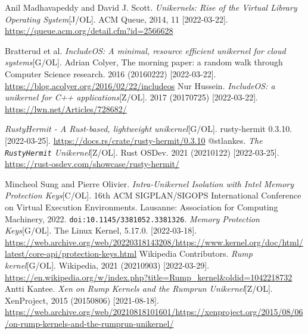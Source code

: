 \documentclass[UTF8,fontset=none,linespread=1.15]{ctexart}
\begin{document}
\begin{thebibliography}{99}
 Anil Madhavapeddy and David J. Scott. \textit{Unikernels: Rise of the Virtual Library Operating System}[J/OL]. ACM Queue, 2014, 11 [2022-03-22].  \url{https://queue.acm.org/detail.cfm?id=2566628}

  Bratterud et al. \textit{IncludeOS: A minimal, resource efficient unikernel for cloud systems}[G/OL]. Adrian Colyer, The morning paper: a random walk through Computer Science research. 2016 (20160222) [2022-03-22]. \url{https://blog.acolyer.org/2016/02/22/includeos}
 Nur Hussein. \textit{IncludeOS: a unikernel for C++ applications}[Z/OL]. 2017 (20170725) [2022-03-22]. \url{https://lwn.net/Articles/728682/}

 \textit{RustyHermit - A Rust-based, lightweight unikernel}[G/OL]. rusty-hermit 0.3.10. [2022-03-25]. \url{https://docs.rs/crate/rusty-hermit/0.3.10}
 @stlankes. \textit{The \texttt{RustyHermit} Unikernel}[Z/OL]. Rust OSDev. 2021 (20210122) [2022-03-25]. \url{https://rust-osdev.com/showcase/rusty-hermit/}

 Mincheol Sung and Pierre Olivier. \textit{Intra-Unikernel Isolation with Intel Memory Protection Keys}[C/OL]. 16th ACM SIGPLAN/SIGOPS International Conference on Virtual Execution Environments. Lausanne: Association for Computing Machinery, 2022. \texttt{doi:10.1145/3381052.3381326}.
 \textit{Memory Protection Keys}[G/OL]. The Linux Kernel, 5.17.0. [2022-03-18]. \url{https://web.archive.org/web/20220318143208/https://www.kernel.org/doc/html/latest/core-api/protection-keys.html}
 Wikipedia Contributors. \textit{Rump kernel}[G/OL]. Wikipedia, 2021 (20210903) [2022-03-29]. \url{https://en.wikipedia.org/w/index.php?title=Rump_kernel&oldid=1042218732}
 Antti Kantee. \textit{Xen on Rump Kernels and the Rumprun Unikernel}[Z/OL]. XenProject, 2015 (20150806) [2021-08-18].  \url{https://web.archive.org/web/20210818101601/https://xenproject.org/2015/08/06/on-rump-kernels-and-the-rumprun-unikernel/}


\end{thebibliography}
\end{document}
